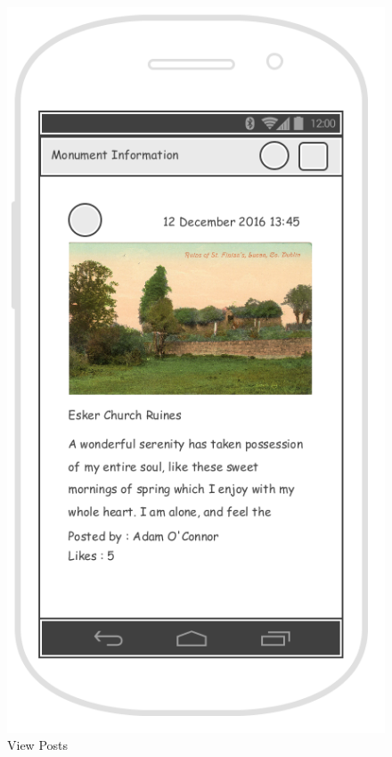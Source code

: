 \begin{figure}[!tbp]
    \hfill
    \begin{minipage}[b]{0.4\textwidth}
        \includegraphics[width=\textwidth]{ViewPostsWireframe}
        \caption{View Posts } 
        \label{Figure: View Posts }
    \end{minipage}
\end{figure}

